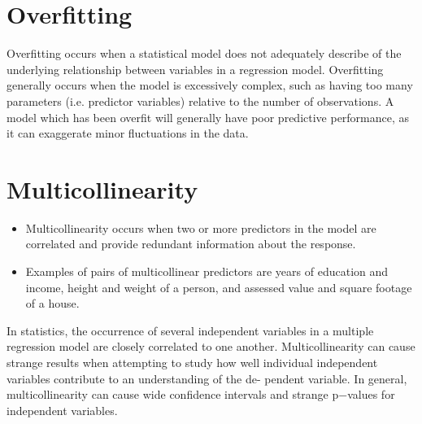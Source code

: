 \documentclass[]{report}
\begin{document}
\section*{Overfitting}
Overfitting occurs when a statistical model does not adequately describe of the underlying
relationship between variables in a regression model. Overfitting generally occurs when the
model is excessively complex, such as having too many parameters (i.e. predictor variables)
relative to the number of observations. A model which has been overfit will generally have poor
predictive performance, as it can exaggerate minor fluctuations in the data.



\section*{Multicollinearity}
\begin{itemize}

\item Multicollinearity occurs when two or more predictors in the model are correlated
and provide redundant information about the response.
\item  Examples of pairs of multicollinear predictors are years of education and income, height and weight of a
person, and assessed value and square footage of a house.

\end{itemize}


In statistics, the occurrence of several independent variables in a multiple regression model are
closely correlated to one another. Multicollinearity can cause strange results when attempting
to study how well individual independent variables contribute to an understanding of the de-
pendent variable. In general, multicollinearity can cause wide confidence intervals and strange
p−values for independent variables.
\end{document}
